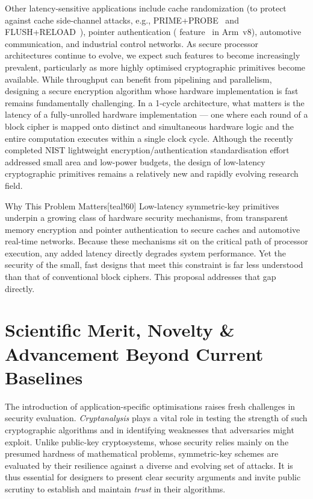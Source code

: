 Other latency-sensitive applications include cache randomization (to protect against cache side-channel attacks, e.g., \textsf{PRIME+PROBE}~\cite{DBLP:journals/iacr/OsvikST05} and \textsf{FLUSH+RELOAD}~\cite{DBLP:conf/uss/YaromF14}), pointer authentication ( feature~\cite{ARMv8-A-2016-additions} in Arm~v8), automotive communication, and industrial control networks.
As secure processor architectures continue to evolve, we expect such features to become increasingly prevalent, particularly as more highly optimised cryptographic primitives become available.
While throughput can benefit from pipelining and parallelism, designing a secure encryption algorithm whose hardware implementation is fast remains fundamentally challenging.
In a 1-cycle architecture, what matters is the latency of a fully-unrolled hardware implementation --- one where each round of a block cipher is mapped onto distinct and simultaneous hardware logic and the entire computation executes within a single clock cycle.
Although the recently completed NIST lightweight encryption/authentication standardisation effort addressed small area and low-power budgets, the design of low-latency cryptographic primitives remains a relatively new and rapidly evolving research field.

\begin{genericbox}{Why This Problem Matters}[teal!60]
Low-latency symmetric-key primitives underpin a growing class of hardware security mechanisms, from transparent memory encryption and pointer authentication to secure caches and automotive real-time networks.
Because these mechanisms sit on the critical path of processor execution, any added latency directly degrades system performance.
Yet the security of the small, fast designs that meet this constraint is far less understood than that of conventional block ciphers.
This proposal addresses that gap directly.
\end{genericbox}

\section{Scientific Merit, Novelty \& Advancement Beyond Current Baselines}

The introduction of application-specific optimisations raises fresh challenges in security evaluation.
\emph{Cryptanalysis} plays a vital role in testing the strength of such cryptographic algorithms and in identifying weaknesses that adversaries might exploit.
Unlike public-key cryptosystems, whose security relies mainly on the presumed hardness of mathematical problems, symmetric-key schemes are evaluated by their resilience against a diverse and evolving set of attacks.
It is thus essential for designers to present clear security arguments and invite public scrutiny to establish and maintain \emph{trust} in their algorithms.

